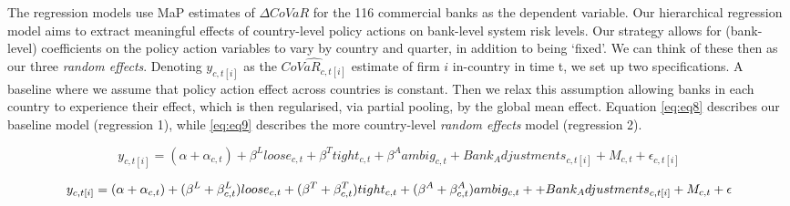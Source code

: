 \documentclass[
  10pt,
]{article}
\begin{document}
The regression models use MaP estimates of \(\Delta CoVaR\) for the 116
commercial banks as the dependent variable. Our hierarchical regression
model aims to extract meaningful effects of country-level policy actions
on bank-level system risk levels. Our strategy allows for (bank-level)
coefficients on the policy action variables to vary by country and
quarter, in addition to being `fixed'. We can think of these then as our
three \emph{random effects}. Denoting \(y_{c,t[i]}\) as the
\(\widehat{CoVaR_{c,t[i]}}\) estimate of firm \(i\) in-country in time
t, we set up two specifications. A baseline where we assume that policy
action effect across countries is constant. Then we relax this
assumption allowing banks in each country to experience their effect,
which is then regularised, via partial pooling, by the global mean
effect. Equation \ref{eq:eq8} describes our baseline model (regression
1), while \ref{eq:eq9} describes the more country-level \emph{random
effects} model (regression 2).

\begin{equation}\label{eq:eq8}
 y_{c,t[i]} = (\alpha + \alpha_{c,t}) + \beta^L loose_{c,t}+\beta^T tight_{c,t}+\beta^A ambig_{c,t}+Bank_Adjustments_{c,t[i]}+M_{c,t}+\epsilon_{c,t[i]}
\end{equation}

\begin{equation}\label{eq:eq9}
y_{c,t[i]} = (\alpha + \alpha_{c,t}) + (\beta^L+\beta^L_{c,t})loose_{c,t}+(\beta^T+\beta^T_{c,t})tight_{c,t} \\
  +(\beta^A+\beta^A_{c,t})ambig_{c,t}++Bank_Adjustments_{c,t[i]}+M_{c,t}+\epsilon
\end{equation}
\end{document}
